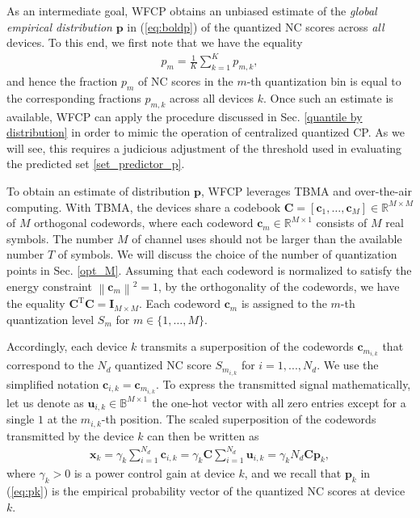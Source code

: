 \documentclass[12pt, draftclsnofoot, onecolumn]{IEEEtran}
\begin{document}
As an intermediate goal, WFCP obtains an unbiased estimate of the \emph{global empirical distribution} $\boldsymbol{p}$ in (\ref{eq:boldp}) of the quantized NC scores across \emph{all} devices. To this end, we first note that we have the equality
\begin{align}\label{G_distr}
    p_{m}=\frac{1}{K}\sum_{k=1}^{K}p_{m,k},
\end{align}
and hence the fraction $ p_{m}$ of NC scores in the $m$-th quantization bin is equal to the corresponding fractions $p_{m,k}$ across all devices $k$. Once such an estimate is available, WFCP can apply the procedure discussed in Sec. \ref{quantile by distribution} in order to mimic the operation of centralized quantized CP. As we will see, this requires a judicious adjustment of the threshold used in evaluating the predicted set \eqref{set_predictor_p}.


To obtain an estimate of distribution $\boldsymbol{p}$, WFCP leverages TBMA and over-the-air computing. With TBMA, the devices share a codebook $\boldsymbol{C} = \left[\boldsymbol{c}_1, \ldots, \boldsymbol{c}_M \right] \in \mathbb{R}^{M \times M}$ of $M$ orthogonal codewords, where each codeword $\boldsymbol{c}_m\in\mathbb{R}^{M\times1}$ consists of $M$ real symbols. The number $M$ of channel uses should not be larger than the available number $T$ of symbols. We will discuss the choice of the number of quantization points in Sec. \ref{opt_M}. Assuming that each codeword is normalized to satisfy the energy constraint $\left\|\boldsymbol{c}_m \right\| ^2 = 1$, by the orthogonality of the codewords, we have the equality $\boldsymbol{C}^{\mathrm{T}}\boldsymbol{C}=\mathbf{I}_{M\times M}$. Each codeword $\boldsymbol{c}_m$ is assigned to the $m$-th quantization level $S_m$ for $m\in\{1,\ldots,M\}$. 

Accordingly, each device $k$ transmits a superposition of the codewords $\boldsymbol{c}_{m_{i,k}}$ that correspond to the $N_d$ quantized NC score  $S_{m_{i,k}}$ for $i=1,...,N_d$. We use the simplified notation $\boldsymbol{c}_{i,k}=\boldsymbol{c}_{m_{i,k}}$. To express the transmitted signal mathematically, let us denote as $\boldsymbol{u}_{i,k}\in\mathbb{B}^{M\times 1}$ the one-hot vector with all zero entries except for a single $1$ at the $m_{i,k}$-th position. The scaled superposition of the codewords transmitted by the device $k$ can then be written as
 \begin{align}
    \boldsymbol{x}_k = \gamma_k\sum^{N_d}_{i=1}\boldsymbol{c}_{i,k} = \gamma_k\boldsymbol{C} \sum_{i=1}^{N_d}\boldsymbol{u}_{i,k} = \gamma_kN_d\boldsymbol{C}\boldsymbol{p}_k,
\end{align}
where $\gamma_k>0$ is a power control gain at device $k$, and we recall that $\boldsymbol{p}_k$ in (\ref{eq:pk}) is the empirical probability vector of the quantized NC scores at device $k$.
\end{document}
